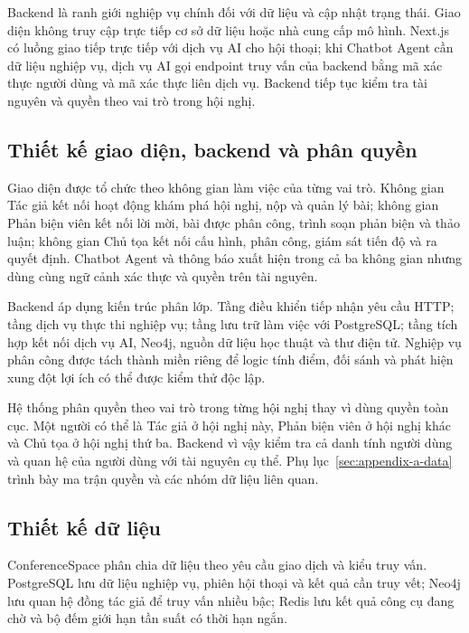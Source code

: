 Backend là ranh giới nghiệp vụ chính đối với dữ liệu và cập nhật trạng thái. Giao diện không truy cập trực tiếp cơ sở dữ liệu hoặc nhà cung cấp mô hình. Next.js có luồng giao tiếp trực tiếp với dịch vụ AI cho hội thoại; khi Chatbot Agent cần dữ liệu nghiệp vụ, dịch vụ AI gọi endpoint truy vấn của backend bằng mã xác thực người dùng và mã xác thực liên dịch vụ. Backend tiếp tục kiểm tra tài nguyên và quyền theo vai trò trong hội nghị.

\subsection{Thiết kế giao diện, backend và phân quyền}

Giao diện được tổ chức theo không gian làm việc của từng vai trò. Không gian Tác giả kết nối hoạt động khám phá hội nghị, nộp và quản lý bài; không gian Phản biện viên kết nối lời mời, bài được phân công, trình soạn phản biện và thảo luận; không gian Chủ tọa kết nối cấu hình, phân công, giám sát tiến độ và ra quyết định. Chatbot Agent và thông báo xuất hiện trong cả ba không gian nhưng dùng cùng ngữ cảnh xác thực và quyền trên tài nguyên.

Backend áp dụng kiến trúc phân lớp. Tầng điều khiển tiếp nhận yêu cầu HTTP; tầng dịch vụ thực thi nghiệp vụ; tầng lưu trữ làm việc với PostgreSQL; tầng tích hợp kết nối dịch vụ AI, Neo4j, nguồn dữ liệu học thuật và thư điện tử. Nghiệp vụ phân công được tách thành miền riêng để logic tính điểm, đối sánh và phát hiện xung đột lợi ích có thể được kiểm thử độc lập.

Hệ thống phân quyền theo vai trò trong từng hội nghị thay vì dùng quyền toàn cục. Một người có thể là Tác giả ở hội nghị này, Phản biện viên ở hội nghị khác và Chủ tọa ở hội nghị thứ ba. Backend vì vậy kiểm tra cả danh tính người dùng và quan hệ của người dùng với tài nguyên cụ thể. Phụ lục~\ref{sec:appendix-a-data} trình bày ma trận quyền và các nhóm dữ liệu liên quan.

\subsection{Thiết kế dữ liệu}

ConferenceSpace phân chia dữ liệu theo yêu cầu giao dịch và kiểu truy vấn. PostgreSQL lưu dữ liệu nghiệp vụ, phiên hội thoại và kết quả cần truy vết; Neo4j lưu quan hệ đồng tác giả để truy vấn nhiều bậc; Redis lưu kết quả công cụ đang chờ và bộ đếm giới hạn tần suất có thời hạn ngắn.

